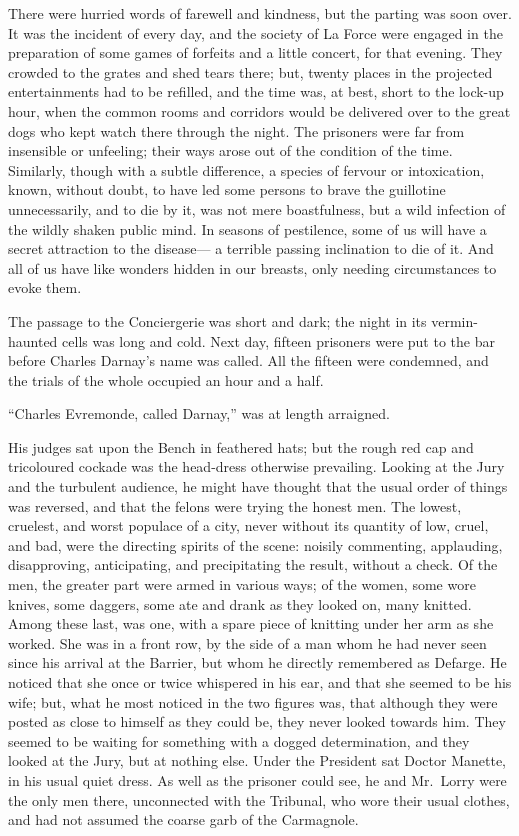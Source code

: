 There were hurried words of farewell and kindness, but the parting
was soon over.  It was the incident of every day, and the society of
La Force were engaged in the preparation of some games of forfeits
and a little concert, for that evening.  They crowded to the grates
and shed tears there; but, twenty places in the projected
entertainments had to be refilled, and the time was, at best, short
to the lock-up hour, when the common rooms and corridors would be
delivered over to the great dogs who kept watch there through the
night.  The prisoners were far from insensible or unfeeling; their
ways arose out of the condition of the time.  Similarly, though with
a subtle difference, a species of fervour or intoxication, known,
without doubt, to have led some persons to brave the guillotine
unnecessarily, and to die by it, was not mere boastfulness, but a
wild infection of the wildly shaken public mind.  In seasons of
pestilence, some of us will have a secret attraction to the disease---%
a terrible passing inclination to die of it.  And all of us have like
wonders hidden in our breasts, only needing circumstances to evoke them.

The passage to the Conciergerie was short and dark; the night in its
vermin-haunted cells was long and cold.  Next day, fifteen prisoners
were put to the bar before Charles Darnay's name was called.  All the
fifteen were condemned, and the trials of the whole occupied an hour
and a half.

``Charles Evremonde, called Darnay,'' was at length arraigned.

His judges sat upon the Bench in feathered hats; but the rough red
cap and tricoloured cockade was the head-dress otherwise prevailing.
Looking at the Jury and the turbulent audience, he might have thought
that the usual order of things was reversed, and that the felons were
trying the honest men.  The lowest, cruelest, and worst populace of a
city, never without its quantity of low, cruel, and bad, were the
directing spirits of the scene:  noisily commenting, applauding,
disapproving, anticipating, and precipitating the result, without a
check.  Of the men, the greater part were armed in various ways; of
the women, some wore knives, some daggers, some ate and drank as they
looked on, many knitted.  Among these last, was one, with a spare
piece of knitting under her arm as she worked.  She was in a front
row, by the side of a man whom he had never seen since his arrival at
the Barrier, but whom he directly remembered as Defarge.  He noticed
that she once or twice whispered in his ear, and that she seemed to
be his wife; but, what he most noticed in the two figures was, that
although they were posted as close to himself as they could be, they
never looked towards him.  They seemed to be waiting for something
with a dogged determination, and they looked at the Jury, but at
nothing else.  Under the President sat Doctor Manette, in his usual
quiet dress.  As well as the prisoner could see, he and Mr.\ Lorry
were the only men there, unconnected with the Tribunal, who wore their
usual clothes, and had not assumed the coarse garb of the Carmagnole.

